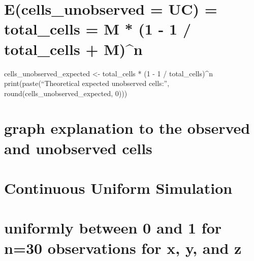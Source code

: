\documentclass[
  letterpaper,
  DIV=11,
  numbers=noendperiod]{scrreprt}
\begin{document}

\chapter{E(cells\_unobserved = UC) = total\_cells = M * (1 - 1 /
total\_cells +
M)\^{}n}\label{ecells_unobserved-uc-total_cells-m-1---1-total_cells-mn}

cells\_unobserved\_expected \textless- total\_cells * (1 - 1 /
total\_cells)\^{}n print(paste(``Theoretical expected unobserved
cells:'', round(cells\_unobserved\_expected, 0)))


\chapter{graph explanation to the observed and unobserved
cells}\label{graph-explanation-to-the-observed-and-unobserved-cells}


\chapter{Continuous Uniform
Simulation}\label{continuous-uniform-simulation}


\chapter{uniformly between 0 and 1 for n=30 observations for x, y, and
z}\label{uniformly-between-0-and-1-for-n30-observations-for-x-y-and-z}
\end{document}
